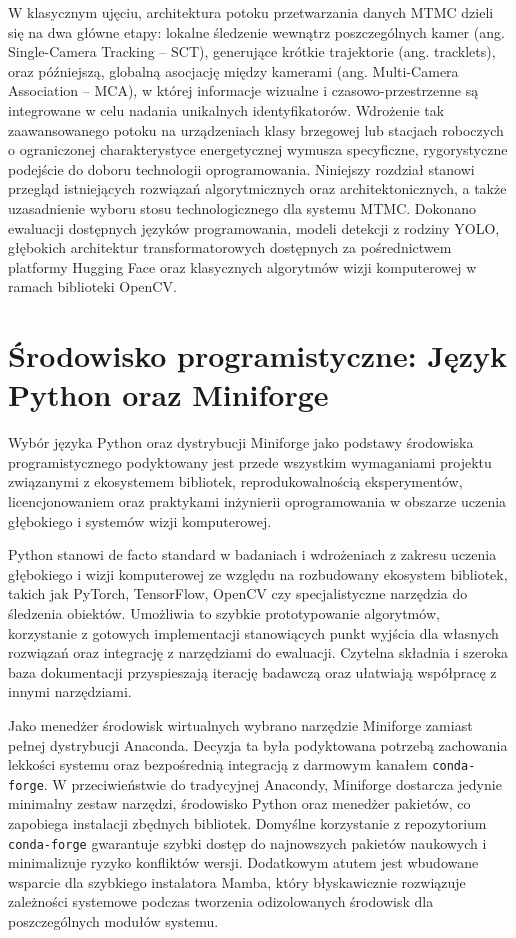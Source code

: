 W klasycznym ujęciu, architektura potoku przetwarzania danych MTMC dzieli się na dwa główne etapy:
lokalne śledzenie wewnątrz poszczególnych kamer (ang. Single-Camera Tracking – SCT), generujące
krótkie trajektorie (ang. tracklets), oraz późniejszą, globalną asocjację między kamerami (ang.
Multi-Camera Association – MCA), w której informacje wizualne i czasowo-przestrzenne są integrowane
w celu nadania unikalnych identyfikatorów. Wdrożenie tak zaawansowanego potoku na urządzeniach
klasy brzegowej lub stacjach roboczych o ograniczonej charakterystyce energetycznej wymusza
specyficzne, rygorystyczne podejście do doboru technologii oprogramowania. Niniejszy rozdział
stanowi przegląd istniejących rozwiązań algorytmicznych oraz architektonicznych, a także
uzasadnienie wyboru stosu technologicznego dla systemu MTMC. Dokonano ewaluacji dostępnych języków
programowania, modeli detekcji z rodziny YOLO, głębokich architektur transformatorowych dostępnych
za pośrednictwem platformy Hugging Face oraz klasycznych algorytmów wizji komputerowej w ramach
biblioteki OpenCV.

\section{Środowisko programistyczne: Język Python oraz Miniforge}
\label{sec:środowisko}

Wybór języka Python oraz dystrybucji Miniforge jako podstawy środowiska programistycznego
podyktowany jest przede wszystkim wymaganiami projektu związanymi z ekosystemem bibliotek,
reprodukowalnością eksperymentów, licencjonowaniem oraz praktykami inżynierii oprogramowania w
obszarze uczenia głębokiego i systemów wizji komputerowej.

Python stanowi de facto standard w badaniach i wdrożeniach z zakresu uczenia głębokiego i wizji
komputerowej ze względu na rozbudowany ekosystem bibliotek, takich jak PyTorch, TensorFlow, OpenCV
czy specjalistyczne narzędzia do śledzenia obiektów. Umożliwia to szybkie prototypowanie
algorytmów, korzystanie z gotowych implementacji stanowiących punkt wyjścia dla własnych rozwiązań
oraz integrację z narzędziami do ewaluacji. Czytelna składnia i szeroka baza dokumentacji
przyspieszają iterację badawczą oraz ułatwiają współpracę z innymi narzędziami.

Jako menedżer środowisk wirtualnych wybrano narzędzie Miniforge zamiast pełnej dystrybucji
Anaconda. Decyzja ta była podyktowana potrzebą zachowania lekkości systemu oraz bezpośrednią
integracją z darmowym kanałem \texttt{conda-forge}. W przeciwieństwie do tradycyjnej Anacondy,
Miniforge dostarcza jedynie minimalny zestaw narzędzi, środowisko Python oraz menedżer pakietów, co
zapobiega instalacji zbędnych bibliotek. Domyślne korzystanie z repozytorium \texttt{conda-forge}
gwarantuje szybki dostęp do najnowszych pakietów naukowych i minimalizuje ryzyko konfliktów wersji.
Dodatkowym atutem jest wbudowane wsparcie dla szybkiego instalatora Mamba, który błyskawicznie
rozwiązuje zależności systemowe podczas tworzenia odizolowanych środowisk dla poszczególnych
modułów systemu.

